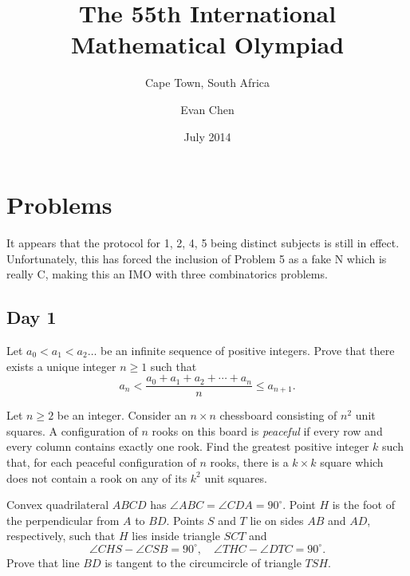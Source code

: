 \documentclass[11pt]{scrreprt}
\numberwithin{figure}{chapter}
\begin{document}
\title{The 55th International Mathematical Olympiad}
\subtitle{Cape Town, South Africa}
\author{Evan Chen}
\date{July 2014}
\maketitle

\tableofcontents

\chapter{Problems}
It appears that the protocol for 1, 2, 4, 5 being distinct subjects is still in effect.
Unfortunately, this has forced the inclusion of Problem 5 as a fake N which is really C, making this an
IMO with three combinatorics problems.
\section{Day 1}
\begin{problem}
  Let $a_0 < a_1 < a_2 \ldots$ be an infinite sequence of positive integers.
  Prove that there exists a unique integer $n\geq 1$ such that \[a_n <
  \frac{a_0+a_1+a_2+\cdots+a_n}{n} \leq a_{n+1}.\]
\end{problem}
\begin{problem}
  Let $n \ge 2$ be an integer. Consider an $n \times n$ chessboard consisting of $n^2$ unit squares.
  A configuration of $n$ rooks on this board is \emph{peaceful} if every row and
  every column contains exactly one rook.
  Find the greatest positive integer $k$ such that, for each peaceful configuration of $n$ rooks,
  there is a $k \times k$ square which does not contain a rook on any of its $k^2$ unit squares.
\end{problem}
\begin{problem}
  Convex quadrilateral $ABCD$ has $\angle ABC = \angle CDA = 90^{\circ}$.
  Point $H$ is the foot of the perpendicular from $A$ to $BD$.
  Points $S$ and $T$ lie on sides $AB$ and $AD$, respectively, such that $H$ lies inside triangle $SCT$ and \[
\angle CHS - \angle CSB = 90^{\circ}, \quad \angle THC - \angle DTC = 90^{\circ}. \] Prove that line $BD$ is tangent to the circumcircle of triangle $TSH$.
\end{problem}
\end{document}
